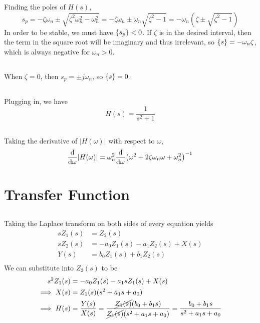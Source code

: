 \documentclass{article}
\let\Re\relax
\DeclareMathOperator{\Re}{\mathfrak{R}}
\begin{document}
Finding the poles of \(H(s)\),
\begin{equation}
    s_p = -\zeta \omega_n \pm \sqrt{\zeta^2 \omega_n^2 - \omega_n^2} = -\zeta \omega_n \pm \omega_n \sqrt{\zeta^2 - 1} = -\omega_n (\zeta \pm \sqrt{\zeta^2 - 1})
\end{equation}
In order to be stable, we must have \(\Re\{s_p\} < 0\).
If \(\zeta\) is in the desired interval, then the term in the square root will be imaginary and thus irrelevant, so \(\Re\{s\} = -\omega_n \zeta\), which is always negative for \(\omega_n > 0\).

\subsection{}

When \(\zeta = 0\), then \(s_p = \pm j\omega_n\), so \(\Re\{s\} = 0\).

\subsection{}

Plugging in, we have
\begin{equation}
    H(s) = \frac{1}{s^2 + 1}
\end{equation}

\subsection{}

Taking the derivative of \(|H(\omega)|\) with respect to \(\omega\),
\begin{align}
    \dv{\omega} |H(\omega)| &= \omega_n^2 \dv{\omega} (\omega^2 + 2\zeta \omega_n \omega + \omega_n^2)^{-1} \\
\end{align}

\section{Transfer Function}

\subsection{}

Taking the Laplace transform on both sides of every equation yields
\begin{align}
    s Z_1(s) &= Z_2(s) \\
    s Z_2(s) &= -a_0 Z_1(s) - a_1 Z_2(s) + X(s) \\
    Y(s) &= b_0 Z_1(s) + b_1 Z_2(s) \\
\end{align}
We can substitute into \(Z_2(s)\) to be
\begin{align}
    s^2 Z_1(s) &= -a_0 Z_1(s) - a_1 s Z_1(s) + X(s) \\
    \implies X(s) &= Z_1(s) (s^2 + a_1 s + a_0) \\
    \implies H(s) &= \frac{Y(s)}{X(s)} = \frac{\cancel{Z_1(s)} (b_0 + b_1 s)}{\cancel{Z_1(s)} (s^2 + a_1 s + a_0)} = \frac{b_0 + b_1 s}{s^2 + a_1 s + a_0}
\end{align}
\end{document}
